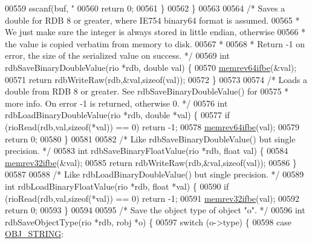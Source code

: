 \begin{DoxyCode}
{{{{{{{00559         sscanf(buf, \textcolor{stringliteral}{"%
00560         \textcolor{keywordflow}{return} 0;
00561     \}
00562 \}
00563 
00564 \textcolor{comment}{/* Saves a double for RDB 8 or greater, where IE754 binary64 format is assumed.}
00565 \textcolor{comment}{ * We just make sure the integer is always stored in little endian, otherwise}
00566 \textcolor{comment}{ * the value is copied verbatim from memory to disk.}
00567 \textcolor{comment}{ *}
00568 \textcolor{comment}{ * Return -1 on error, the size of the serialized value on success. */}
00569 \textcolor{keywordtype}{int} rdbSaveBinaryDoubleValue(rio *rdb, \textcolor{keywordtype}{double} val) \{
00570     \hyperlink{endianconv_8h_aa311b9f944c3b988f3601698a95890c1}{memrev64ifbe}(&val);
00571     \textcolor{keywordflow}{return} rdbWriteRaw(rdb,&val,\textcolor{keyword}{sizeof}(val));
00572 \}
00573 
00574 \textcolor{comment}{/* Loads a double from RDB 8 or greater. See rdbSaveBinaryDoubleValue() for}
00575 \textcolor{comment}{ * more info. On error -1 is returned, otherwise 0. */}
00576 \textcolor{keywordtype}{int} rdbLoadBinaryDoubleValue(rio *rdb, \textcolor{keywordtype}{double} *val) \{
00577     \textcolor{keywordflow}{if} (rioRead(rdb,val,\textcolor{keyword}{sizeof}(*val)) == 0) \textcolor{keywordflow}{return} -1;
00578     \hyperlink{endianconv_8h_aa311b9f944c3b988f3601698a95890c1}{memrev64ifbe}(val);
00579     \textcolor{keywordflow}{return} 0;
00580 \}
00581 
00582 \textcolor{comment}{/* Like rdbSaveBinaryDoubleValue() but single precision. */}
00583 \textcolor{keywordtype}{int} rdbSaveBinaryFloatValue(rio *rdb, \textcolor{keywordtype}{float} val) \{
00584     \hyperlink{endianconv_8h_a771f3656eb7d11a1e7f7294b657d8978}{memrev32ifbe}(&val);
00585     \textcolor{keywordflow}{return} rdbWriteRaw(rdb,&val,\textcolor{keyword}{sizeof}(val));
00586 \}
00587 
00588 \textcolor{comment}{/* Like rdbLoadBinaryDoubleValue() but single precision. */}
00589 \textcolor{keywordtype}{int} rdbLoadBinaryFloatValue(rio *rdb, \textcolor{keywordtype}{float} *val) \{
00590     \textcolor{keywordflow}{if} (rioRead(rdb,val,\textcolor{keyword}{sizeof}(*val)) == 0) \textcolor{keywordflow}{return} -1;
00591     \hyperlink{endianconv_8h_a771f3656eb7d11a1e7f7294b657d8978}{memrev32ifbe}(val);
00592     \textcolor{keywordflow}{return} 0;
00593 \}
00594 
00595 \textcolor{comment}{/* Save the object type of object "o". */}
00596 \textcolor{keywordtype}{int} rdbSaveObjectType(rio *rdb, robj *o) \{
00597     \textcolor{keywordflow}{switch} (o->type) \{
00598     \textcolor{keywordflow}{case} \hyperlink{server_8h_a65236ea160f69cdef33ec942092af88f}{OBJ\_STRING}:
}}}}}}}}
\end{DoxyCode}
